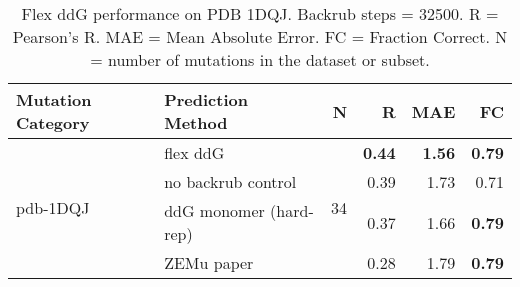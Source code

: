 \begin{table}
  \begin{tabular}{llrrrr}
\toprule
Mutation Category &       Prediction Method &   N &    R &  MAE &   FC \\
\midrule
 \multirow{ 4}{*}{pdb-1DQJ} & flex ddG & \multirow{ 4}{*}{34} & \textbf{0.44} & \textbf{1.56} & \textbf{0.79}  \\
 & no backrub control & & 0.39 & 1.73 & 0.71  \\
 & ddG monomer (hard-rep) & & 0.37 & 1.66 & \textbf{0.79}  \\
 & ZEMu paper & & 0.28 & 1.79 & \textbf{0.79}  \\
\bottomrule
\end{tabular}
  \caption[Flex ddG performance on PDB 1DQJ]{
    Flex ddG performance on PDB 1DQJ. Backrub steps = 32500. R = Pearson's R. MAE = Mean Absolute Error. FC = Fraction Correct. N = number of mutations in the dataset or subset.
  } \label{tab:table-pdb-1DQJ}
\end{table}
